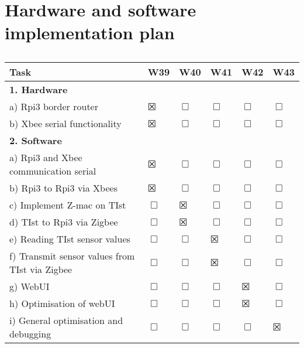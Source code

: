 \section{Hardware and software implementation plan}

\begin{table}[htbp]
	\caption{}
	\begin{tabular}{p{4.1cm}|lllll}
		\toprule
		Task & W39 & W40 & W41 & W42 & W43 \\ 
		\midrule
		\multicolumn{6}{l}{\textbf{1. Hardware}} \\ 
		\midrule
		a) Rpi3 border router & $\XBox$ & $\Box$ & $\Box$ & $\Box$ & $\Box$\\ 
		\midrule
		b) Xbee serial functionality  & $\XBox$ & $\Box$ & $\Box$ & $\Box$ & $\Box$ \\ 
		\midrule
		\multicolumn{6}{l}{\textbf{2. Software}}\\ 
		\midrule
		a) Rpi3 and Xbee communication serial & $\XBox$ & $\Box$ & $\Box$ & $\Box$ & $\Box$ \\ 
		\midrule
		b) Rpi3 to Rpi3 via Xbees  & $\XBox$ & $\Box$ & $\Box$ & $\Box$ & $\Box$\\ 
		\midrule
		c) Implement Z-mac on TIst  & $\Box$ & $\XBox$ & $\Box$ & $\Box$ & $\Box$ \\ 
		\midrule
		d) TIst to Rpi3 via Zigbee  & $\Box$ & $\XBox$ & $\Box$ & $\Box$ & $\Box$  \\ 
		\midrule
		e) Reading TIst sensor values  & $\Box$ & $\Box$ & $\XBox$ & $\Box$ & $\Box$ \\ 
		\midrule
		f) Transmit sensor values from TIst via Zigbee   & $\Box$ & $\Box$ & $\XBox$ & $\Box$ & $\Box$  \\ 
		\midrule
		g) WebUI & $\Box$ & $\Box$ & $\Box$ & $\XBox$ & $\Box$ \\ 
		\midrule
		h) Optimisation of webUI & $\Box$ & $\Box$ & $\Box$ & $\XBox$ & $\Box$ \\ 
		\midrule
		i) General optimisation and debugging  & $\Box$ & $\Box$ & $\Box$ & $\Box$ & $\XBox$  \\ 
		
		\bottomrule
	\end{tabular}
	\label{}
\end{table}

